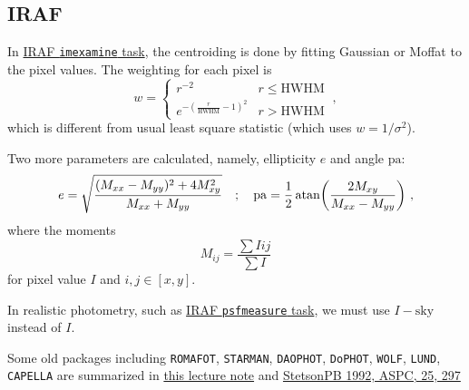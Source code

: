 \subsection{IRAF}
In \href{https://iraf.net/irafhelp.php?val=imexam&help=Help+Page}{IRAF \texttt{imexamine} task}, the centroiding is done by fitting Gaussian or Moffat to the pixel values. The weighting for each pixel is
\begin{equation}\label{eq: imexam weighting}
  w = \left \{ 
  \begin{array}{cr}
    r^{-2} & r \le \mathrm{HWHM} \\
    e^{-\left ( \frac{r}{\mathrm{HWHM}} - 1 \right )^2} & r > \mathrm{HWHM}
  \end{array}
  \right . ~,
\end{equation}
which is different from usual least square statistic (which uses $ w = 1/\sigma^2 $).

Two more parameters are calculated, namely, ellipticity $ e $ and angle $ \mathrm{pa} $:
\begin{equation}
  e = \sqrt{\frac{ (M_{xx} - M_{yy})^2 + 4 M_{xy}^2}{M_{xx} + M_{yy}}}
  \quad;\quad
  \mathrm{pa}
    = \frac{1}{2} \atan(\frac{2 M_{xy}}{M_{xx} - M_{yy}}) ~,
\end{equation}
where the moments
\begin{equation}
  M_{ij} = \frac{\sum I i j}{\sum I}
\end{equation}
for pixel value $ I $ and $ i, j \in [x, y] $. 

In realistic photometry, such as \href{https://iraf.net/irafhelp.php?val=psfmeasure&help=Help+Page}{IRAF \texttt{psfmeasure} task}, we must use $ I - \mathrm{sky} $ instead of $ I $. 

Some old packages including \texttt{ROMAFOT}, \texttt{STARMAN}, \texttt{DAOPHOT}, \texttt{DoPHOT}, \texttt{WOLF}, \texttt{LUND}, \texttt{CAPELLA} are summarized in \href{http://web.ipac.caltech.edu/staff/fmasci/home/astro_refs/WhyPSFfit.pdf}{this lecture note} and \href{https://ui.adsabs.harvard.edu/abs/1992ASPC...25..297S/abstract}{StetsonPB 1992, ASPC, 25, 297}











